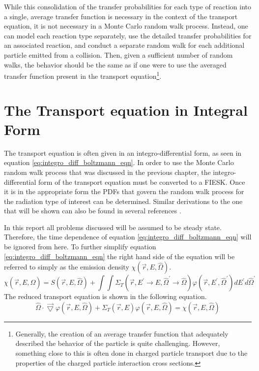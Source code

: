 While this consolidation of the transfer probabilities for each type of 
reaction into a single, average transfer function is necessary in the context 
of the transport equation, it is not necessary in a Monte Carlo random walk 
process. Instead, one can model each reaction type separately, use the 
detailed transfer probabilities for an associated reaction, and conduct 
a separate random walk for each additional particle emitted from a collision. 
Then, given a sufficient number of random walks, the behavior should be the 
same as if one were to use the averaged transfer function present in the 
transport equation\footnote{Generally, the creation of an average transfer
function that adequately described the behavior of the particle is quite
challenging. However, something close to this is often done in charged particle
transport due to the properties of the charged particle interaction cross
sections.}.

\section{The Transport equation in Integral Form}
The transport equation is often given in an integro-differential form, as seen 
in equation \ref{eq:integro_diff_boltzmann_eqn}. In order to use the Monte 
Carlo random walk process that was discussed in the previous chapter, the 
integro-differential form of the transport equation must be converted to a 
FIESK. Once it is in the appropriate form the PDFs that govern the random walk 
process for the radiation type of interest can be determined. Similar 
derivations to the one that will be shown can also be found in several 
references \citep{lewis_computational_1993, hoogenboom_adjoint_1977, irving_adjoint_1971, bell_nuclear_1979}.
 
In this report all problems discussed will be assumed to be steady state. 
Therefore, the time dependence of equation \ref{eq:integro_diff_boltzmann_eqn} 
will be ignored from here. To further simplify equation 
\ref{eq:integro_diff_boltzmann_eqn} the right hand side of the equation will be 
referred to simply as the emission density $\chi(\vec{r},E,\hat{\Omega})$.
\begin{equation}
    \chi(\vec{r},E,\hat{\Omega}) = S(\vec{r},E,\hat{\Omega}) +
    \int\int \Sigma_T(\vec{r},E^{'} \to E,\hat{\Omega}^{'} \to \hat{\Omega})
    \varphi(\vec{r},E^{'},\hat{\Omega}^{'}) dE^{'}d\hat{\Omega}^{'}
  \label{eq:emission_density}
\end{equation}
The reduced transport equation is shown in the following equation.
\begin{equation}
  \hat{\Omega} \cdot \vec{\bigtriangledown} \varphi(\vec{r},E,\hat{\Omega})
  + \Sigma_T(\vec{r},E) \varphi(\vec{r},E,\hat{\Omega}) =  
 \chi(\vec{r},E,\hat{\Omega})
  \label{eq:reduced_transport_eqn}
\end{equation}


